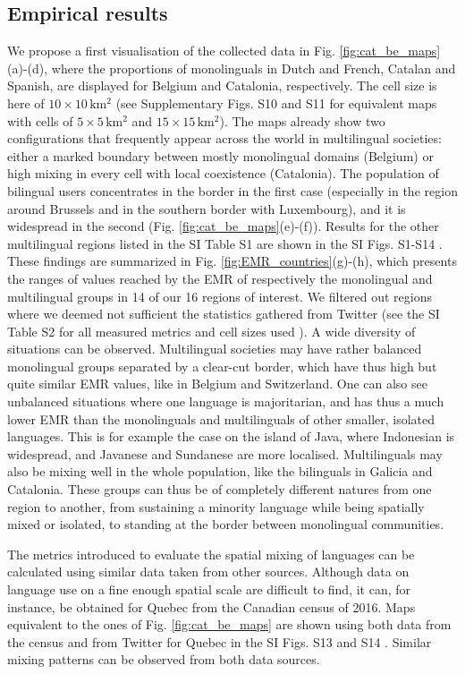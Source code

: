 \documentclass[../thesis.tex]{subfiles}
\begin{document}
\subsection{Empirical results}
We propose a first visualisation of the collected data in Fig.
\cref{fig:cat_be_maps}(a)-(d), where the proportions of
monolinguals in Dutch and French, Catalan and Spanish, are displayed for Belgium and
Catalonia, respectively. The cell size is here of $10 \times 10 \, \si{\kilo \meter
\squared}$ (see Supplementary Figs. S10 and S11 \cite{supp} for equivalent maps with
cells of $5 \times 5 \, \si{\kilo \meter \squared}$ and $15 \times 15 \, \si{\kilo
\meter \squared}$). The maps already show two configurations that frequently appear
across the world in multilingual societies: either a marked boundary between mostly
monolingual domains (Belgium) or high mixing in every cell with local coexistence
(Catalonia). The population of bilingual users concentrates in the border in the first
case (especially in the region around Brussels and in the southern border with
Luxembourg), and it is widespread in the second (Fig.
\cref{fig:cat_be_maps}(e)-(f)). Results for the other
multilingual regions listed in the SI Table S1 are shown in the SI Figs. S1-S14
\cite{supp}. These findings are summarized in Fig.
\cref{fig:EMR_countries}(g)-(h), which presents the ranges of
values reached by the \ac{EMR} of respectively the monolingual and multilingual groups in 14
of our 16 regions of interest. We filtered out regions where we deemed not sufficient
the statistics gathered from Twitter (see the SI Table S2 for all measured metrics and
cell sizes used \cite{supp}). A wide diversity of situations can be observed.
Multilingual societies may have rather balanced monolingual groups separated by a
clear-cut border, which have thus high but quite similar \ac{EMR} values, like in Belgium and
Switzerland. One can also see unbalanced situations where one language is majoritarian,
and has thus a much lower \ac{EMR} than the monolinguals and multilinguals of other smaller,
isolated languages. This is for example the case on the island of Java, where Indonesian
is widespread, and Javanese and Sundanese are more localised. Multilinguals may also be
mixing well in the whole population, like the bilinguals in Galicia and Catalonia. These
groups can thus be of completely different natures from one region to another, from
sustaining a minority language while being spatially mixed or isolated, to standing at
the border between monolingual communities.

The metrics introduced to evaluate the spatial mixing of languages can be calculated
using similar data taken from other sources. Although data on language use on a fine
enough spatial scale are difficult to find, it can, for instance, be obtained for Quebec
from the Canadian census of 2016. Maps equivalent to the ones of Fig.
\cref{fig:cat_be_maps} are shown using both data from the census and from
Twitter for Quebec in the SI Figs. S13 and S14 \cite{supp}. Similar mixing patterns can
be observed from both data sources.
\end{document}
